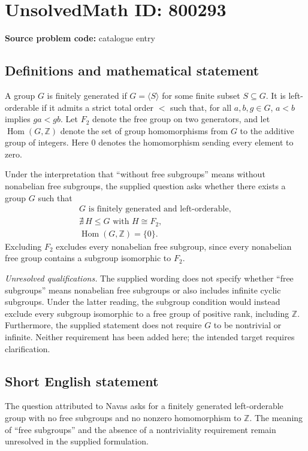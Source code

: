 \documentclass[11pt]{article}
\newcommand{\Z}{\mathbb{Z}}
\begin{document}
\section*{UnsolvedMath ID: 800293}
\textbf{Source problem code:} catalogue entry
\subsection{Definitions and mathematical statement}
A group \(G\) is finitely generated if \(G=\langle S\rangle\) for some finite subset \(S\subseteq G\). It is left-orderable if it admits a strict total order \(<\) such that, for all \(a,b,g\in G\), \(a<b\) implies \(ga<gb\). Let \(F_2\) denote the free group on two generators, and let \(\operatorname{Hom}(G,\Z)\) denote the set of group homomorphisms from \(G\) to the additive group of integers. Here \(0\) denotes the homomorphism sending every element to zero.

Under the interpretation that ``without free subgroups'' means without nonabelian free subgroups, the supplied question asks whether there exists a group \(G\) such that
\[
\begin{gathered}
G\text{ is finitely generated and left-orderable},\\
\nexists\,H\leq G\text{ with }H\cong F_2,\\
\operatorname{Hom}(G,\Z)=\{0\}.
\end{gathered}
\]
Excluding \(F_2\) excludes every nonabelian free subgroup, since every nonabelian free group contains a subgroup isomorphic to \(F_2\).

\textit{Unresolved qualifications.} The supplied wording does not specify whether ``free subgroups'' means nonabelian free subgroups or also includes infinite cyclic subgroups. Under the latter reading, the subgroup condition would instead exclude every subgroup isomorphic to a free group of positive rank, including \(\Z\). Furthermore, the supplied statement does not require \(G\) to be nontrivial or infinite. Neither requirement has been added here; the intended target requires clarification.
\subsection{Short English statement}
The question attributed to Navas asks for a finitely generated left-orderable group with no free subgroups and no nonzero homomorphism to \(\Z\). The meaning of ``free subgroups'' and the absence of a nontriviality requirement remain unresolved in the supplied formulation.
\end{document}
